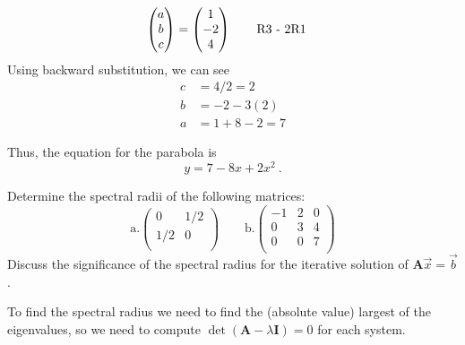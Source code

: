 \documentclass[12pts, answers]{exam}
\newcommand{\ve}[1]{\ensuremath{\mathbf{#1}}}
\begin{document}
\begin{questions}
\begin{solution}
\begin{align}
\begin{pmatrix} a \\ b \\ c \end{pmatrix} &=
\begin{pmatrix} 1 \\ -2 \\ 4 \end{pmatrix} \qquad \text{R3 - 2R1}\nonumber
\end{align}
%
Using backward substitution, we can see
%
\begin{align}
c &= 4/2 = 2 \nonumber \\
b &= -2 - 3(2) \nonumber \\
a &= 1 +8 -2 = 7 \nonumber
\end{align}

Thus, the equation for the parabola is
\begin{equation}
\boxed{y = 7 - 8x + 2 x^2} \:. \nonumber
\end{equation}
\end{solution}


\vspace*{3em}
\addpoints
\question[10] Determine the spectral radii of the following matrices:
%
\renewcommand{\aaa}{0}
\renewcommand{\aab}{1/2}
\renewcommand{\aba}{1/2}
\renewcommand{\abb}{0}
\renewcommand{\baa}{-1}
\renewcommand{\bab}{2}
\renewcommand{\bac}{0}
\renewcommand{\bba}{0}
\renewcommand{\bbb}{3}
\renewcommand{\bbc}{4}
\renewcommand{\bca}{0}
\renewcommand{\bcb}{0}
\renewcommand{\bcc}{7}
%
\begin{equation}
\text{a.} \begin{pmatrix}
   \aaa & \aab \\
   \aba & \abb \\
\end{pmatrix} \qquad
%
\text{b.} \begin{pmatrix}
   \baa & \bab & \bac \\
   \bba & \bbb & \bbc \\
   \bca & \bcb & \bcc \\
\end{pmatrix} \nonumber
\end{equation}
%
Discuss the significance of the spectral radius for the iterative solution of $\ve{A}\vec{x} = \vec{b}$.

\begin{solution}
To find the spectral radius we need to find the (absolute value) largest of the eigenvalues, so we need to compute $\det(\ve{A} - \lambda \ve{I})=0$ for each system.


\end{solution}
\end{questions}
\end{document}
